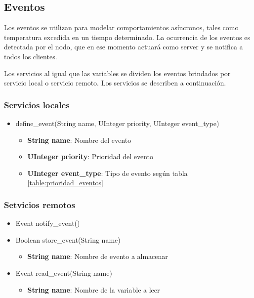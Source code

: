 \subsection{Eventos}
Los eventos se utilizan para modelar comportamientos asíncronos, tales como temperatura excedida en un tiempo determinado. La ocurrencia de los eventos es detectada por el nodo, que en ese momento actuará como server y se notifica a todos los clientes.

Los servicios al igual que las variables se dividen los eventos brindados por servicio local o servicio remoto. Los servicios se describen a continuación.

\subsubsection{Servicios locales}
\begin{itemize}
\item define\_event(String name, UInteger priority, UInteger event\_type)
  \begin{itemize}
  \item \textbf{String name}: Nombre del evento
  \item \textbf{UInteger priority}: Prioridad del evento
  \item \textbf{UInteger event\_type}: Tipo de evento según tabla \ref{table:prioridad_eventos}
  \end{itemize}

\end{itemize}

\subsubsection{Setvicios remotos}

\begin{itemize}
\item Event notify\_event()
\item Boolean store\_event(String name)
  \begin{itemize}
    \item \textbf{String name}: Nombre de evento a almacenar
  \end{itemize}
  
\item Event read\_event(String name)
  \begin{itemize}
    \item \textbf{String name}: Nombre de la variable a leer
  \end{itemize}
\end{itemize}

